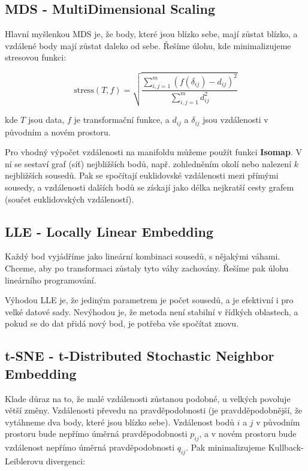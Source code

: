 \subsection{MDS - MultiDimensional Scaling}

Hlavní myšlenkou MDS je, že body, které jsou blízko sebe, mají zůstat blízko, a vzdálené body mají zůstat daleko od sebe. Řešíme úlohu, kde minimalizujeme stresovou funkci:

\begin{equation}
\text{stress}(T, f)=\sqrt{\frac{\sum_{i,j=1}^m(f(\delta_{ij})-d_{ij})^2}{\sum_{i,j=1}^m d_{ij}^2}}
\end{equation}

\noindent kde $T$ jsou data, $f$ je transformační funkce, a $d_{ij}$ a $\delta_{ij}$ jsou vzdálenosti v původním a novém prostoru.

Pro vhodný výpočet vzdálenosti na manifoldu můžeme použít funkci \textbf{Isomap}. V ní se sestaví graf (síť) nejbližších bodů, např. zohledněním okolí nebo nalezení $k$ nejbližších sousedů. Pak se spočítají euklidovské vzdálenosti mezi přímými sousedy, a vzdálenosti dalších bodů se získají jako délka nejkratší cesty grafem (součet euklidovských vzdáleností). 


\subsection{LLE - Locally Linear Embedding}

Každý bod vyjádříme jako lineární kombinaci sousedů, s nějakými váhami. Chceme, aby po transformaci zůstaly tyto váhy zachovány. Řešíme pak úlohu lineárního programování.

Výhodou LLE je, že jediným parametrem je počet sousedů, a je efektivní i pro velké datové sady. Nevýhodou je, že metoda není stabilní v řídkých oblastech, a pokud se do dat přidá nový bod, je potřeba vše spočítat znovu.

\subsection{t-SNE - t-Distributed Stochastic Neighbor Embedding}

Klade důraz na to, že malé vzdálenosti zůstanou podobné, u velkých povoluje větší změny. Vzdálenosti převedu na pravděpodobnosti (je pravdděpodobnější, že vytáhneme dva body, které jsou blízko sebe). Vzdálenost bodů $i$ a $j$ v původním prostoru bude nepřímo úměrná pravděpodobnosti $p_{ij}$, a v novém prostoru bude vzdálenost nepřímo úměrná pravděpodobnosti $q_{ij}$. Pak minimalizujeme Kullback-Leiblerovu divergenci:

